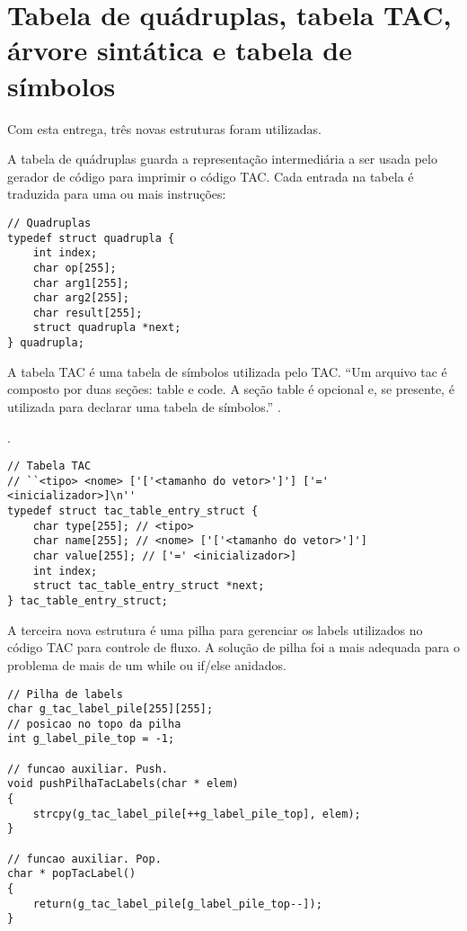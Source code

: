 \documentclass[12pt]{article}
\begin{document}
\section{Tabela de quádruplas, tabela TAC, árvore sintática e tabela de símbolos}

\indent

Com esta entrega, três novas estruturas foram utilizadas.

A tabela de quádruplas guarda a representação intermediária a ser usada pelo gerador de código para imprimir o código TAC. Cada entrada na tabela é traduzida para uma ou mais instruções:

\begin{lstlisting}
// Quadruplas
typedef struct quadrupla {
    int index;
    char op[255];
    char arg1[255];
    char arg2[255];
    char result[255];
    struct quadrupla *next;
} quadrupla;
\end{lstlisting}

A tabela TAC é uma tabela de símbolos utilizada pelo TAC. ``Um arquivo tac é composto por duas seções: table e code. A seção table é opcional e, se presente, é utilizada para declarar uma tabela de símbolos.'' \cite{tac2014}.

 \cite{tac2014}.

\begin{lstlisting}
// Tabela TAC
// ``<tipo> <nome> ['['<tamanho do vetor>']'] ['=' <inicializador>]\n''
typedef struct tac_table_entry_struct {
    char type[255]; // <tipo>
    char name[255]; // <nome> ['['<tamanho do vetor>']']
    char value[255]; // ['=' <inicializador>]
    int index;
    struct tac_table_entry_struct *next;
} tac_table_entry_struct;
\end{lstlisting}

A terceira nova estrutura é uma pilha para gerenciar os labels utilizados no código TAC para controle de fluxo. A solução de pilha foi a mais adequada para o problema de mais de um while ou if/else anidados.

\begin{lstlisting}
// Pilha de labels
char g_tac_label_pile[255][255];
// posicao no topo da pilha
int g_label_pile_top = -1;

// funcao auxiliar. Push.
void pushPilhaTacLabels(char * elem)
{
    strcpy(g_tac_label_pile[++g_label_pile_top], elem);
}

// funcao auxiliar. Pop.
char * popTacLabel()
{
    return(g_tac_label_pile[g_label_pile_top--]);
}
\end{lstlisting}
\end{document}

